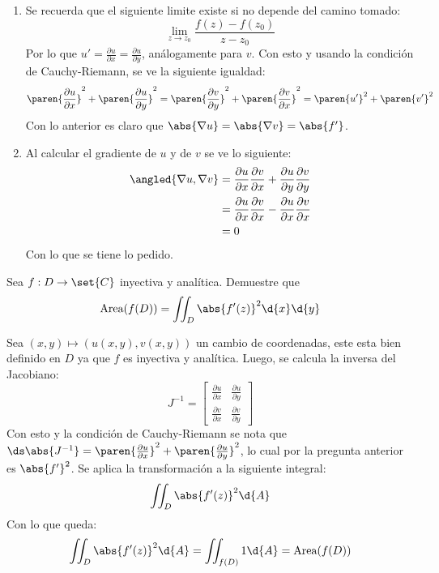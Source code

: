 \documentclass{homework}
\begin{document}
\begin{sol}
    \begin{enumerate}
        \item Se recuerda que el siguiente limite existe si no depende del camino tomado:
              \[\lim_{z\rightarrow z_0}\frac{f(z)-f(z_0)}{z-z_0}\]
              Por lo que \(u'=\frac{\partial u}{\partial x}=\frac{\partial u}{\partial y}\), análogamente para \(v\). Con esto y usando la condición de Cauchy-Riemann, se ve la siguiente igualdad:
              \[\paren{\frac{\partial u}{\partial x}}^2+\paren{\frac{\partial u}{\partial y}}^2=\paren{\frac{\partial v}{\partial y}}^2+\paren{\frac{\partial v}{\partial x}}^2=\paren{u'}^2+\paren{v'}^2\]
              Con lo anterior es claro que \(\abs{\nabla u}=\abs{\nabla v}=\abs{f'}\).
        \item Al calcular el gradiente de \(u\) y de \(v\) se ve lo siguiente:
              \begin{align*}
                  \angled{\nabla u,\nabla v} & = \frac{\partial u}{\partial x}\frac{\partial v}{\partial x}+\frac{\partial u}{\partial y}\frac{\partial v}{\partial y} \\
                                             & =\frac{\partial u}{\partial x}\frac{\partial v}{\partial x}-\frac{\partial u}{\partial x}\frac{\partial v}{\partial x}  \\
                                             & =0
              \end{align*}
              Con lo que se tiene lo pedido.
    \end{enumerate}
\end{sol}

\begin{prob}
    Sea \(f:D\rightarrow\set{C}\) inyectiva y analítica. Demuestre que
    \[\text{Area}(f(D))=\iint_D\abs{f'(z)}^2\d{x}\d{y}\]
\end{prob}

\begin{sol}
    Sea \((x,y)\mapsto(u(x,y),v(x,y))\) un cambio de coordenadas, este esta bien definido en \(D\) ya que \(f\) es inyectiva y analítica. Luego, se calcula la inversa del Jacobiano:
    \[J^{-1}=\begin{bmatrix}
            \frac{\partial u}{\partial x} & \frac{\partial u}{\partial y} \\
            \frac{\partial v}{\partial x} & \frac{\partial v}{\partial y}
        \end{bmatrix}\]
    Con esto y la condición de Cauchy-Riemann se nota que \(\ds\abs{J^{-1}}=\paren{\frac{\partial u}{\partial x}}^2+\paren{\frac{\partial u}{\partial y}}^2\), lo cual por la pregunta anterior es \(\abs{f'}^2\). Se aplica la transformación a la siguiente integral:
    \[\iint_D\abs{f'(z)}^2\d{A}\]
    Con lo que queda:
    \[\iint_D\abs{f'(z)}^2\d{A}=\iint_{f(D)}1\d{A}=\text{Area}(f(D))\]
\end{sol}
\end{document}
